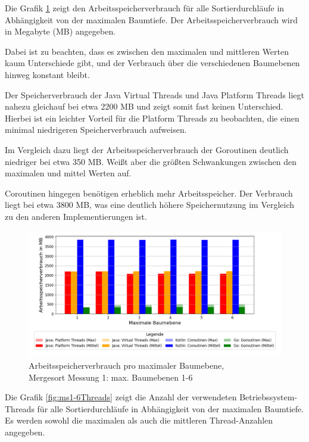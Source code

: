 \documentclass[fontsize=12pt,paper=a4,twoside=semi,parskip=half-,headsepline,headinclude]{scrreprt}
\begin{document}
Die Grafik \ref{fig:ms1-6RAM} zeigt den Arbeitsspeicherverbrauch für alle Sortierdurchläufe in Ab\-hän\-gig\-keit von der maximalen Baumtiefe. Der Arbeitsspeicherverbrauch wird in Megabyte (MB) angegeben.

Dabei ist zu beachten, dass es zwischen den maximalen und mittleren Werten kaum Unterschiede gibt, und der Verbrauch über die verschiedenen Baumebenen hinweg konstant bleibt.

Der Speicherverbrauch der Java Virtual Threads und Java Platform Threads liegt nahezu gleichauf bei etwa 2200 MB und zeigt somit fast keinen Unterschied. Hierbei ist ein leichter Vorteil für die Platform Threads zu beobachten, die einen minimal niedrigeren Speicherverbrauch aufweisen.

Im Vergleich dazu liegt der Arbeitsspeicherverbrauch der Goroutinen deutlich niedriger bei etwa 350 MB. Weißt aber die größten Schwankungen zwischen den maximalen und mittel Werten auf.

Coroutinen hingegen benötigen erheblich mehr Arbeitsspeicher. Der Verbrauch liegt bei etwa  3800 MB, was eine deutlich höhere Speichernutzung im Vergleich zu den anderen Implementierungen ist.

\begin{figure}[H]
	\centering
	\includegraphics[scale=0.5]{figures/mergesort/Maximalebauebenen1-6/memory_usage_bar_plot.png}
	\caption{Arbeitsspeicherverbrauch pro maximaler Baumebene,\\ Mergesort Messung 1: max. Baumebenen 1-6}
	\label{fig:ms1-6RAM}
\end{figure}

Die Grafik \ref{fig:ms1-6Threads} zeigt die Anzahl der verwendeten Betriebssystem-Threads für alle Sortierdurchläufe in Abhängigkeit von der maximalen Baumtiefe. Es werden sowohl die maximalen als auch die mittleren Thread-Anzahlen angegeben.
\end{document}
